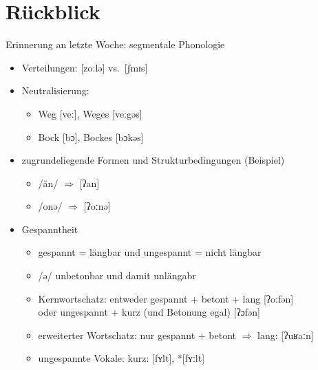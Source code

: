 
\section{Rückblick}

\begin{frame}
  {Erinnerung an letzte Woche: segmentale Phonologie}
  \pause
  \begin{itemize}[<+->]
    \item Verteilungen: [zoːlə] vs.\ [ʃmɪs]
    \item Neutralisierung:
      \begin{itemize}[<+->]
        \item  Weg [veː], Weges [veː\alert{g}əs]
        \item Bock [bɔ], Bockes [bɔ\alert{k}əs]
      \end{itemize}
    \item zugrundeliegende Formen und Strukturbedingungen (Beispiel)
      \begin{itemize}[<+->]
        \item /ăn/ $\Rightarrow$ [ʔan]
        \item /onə/ $\Rightarrow$ [ʔoːnə] 
      \end{itemize}
    \item Gespanntheit
      \begin{itemize}[<+->]
        \item \alert{gespannt = längbar} und \alert{ungespannt = nicht längbar}
        \item \alert{/ə/ unbetonbar und damit unlängabr}
        \item Kernwortschatz: entweder \alert{gespannt + betont + lang} [ʔoːfən]\\
          oder \alert{ungespannt + kurz} (und Betonung egal) [ʔɔfən]
        \item erweiterter Wortschatz: \alert{nur} \alert{gespannt + betont $\Rightarrow$ lang}: [ʔuʁaːn]
        \item ungespannte Vokale:  kurz: [fʏlt], *[fʏːlt]
      \end{itemize}
  \end{itemize}
\end{frame}


